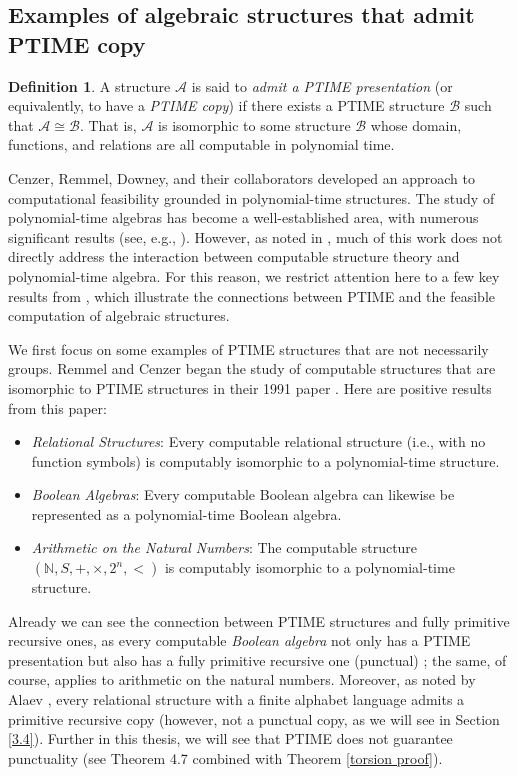 \documentclass{pracalicmgr2025}
\theoremstyle{plain}            %
\theoremstyle{remark}           %
\theoremstyle{definition}       %
\newtheorem{definition}[theorem]{Definition}
\begin{document}
\subsection{Examples of  algebraic structures that admit PTIME copy}
\begin{definition}
A structure $\mathcal{A}$ is said to \emph{admit a PTIME presentation} (or equivalently, to have a \emph{PTIME copy}) if there exists a PTIME structure $\mathcal{B}$ such that $\mathcal{A} \cong \mathcal{B}$. That is, $\mathcal{A}$ is isomorphic to some structure $\mathcal{B}$ whose domain, functions, and relations are all computable in polynomial time.
\end{definition}

Cenzer, Remmel, Downey, and their collaborators developed an approach to computational feasibility grounded in polynomial-time structures. The study of polynomial-time algebras has become a well-established area, with numerous significant results (see, e.g., \cite{CENZER199117,cenzer1992polynomial,cenzer2009space,grigorieff1990every}). However, as noted in \cite{3}, much of this work does not directly address the interaction between computable structure theory and polynomial-time algebra. For this reason, we restrict attention here to a few key results from \cite{cenzer1992polynomial,CENZER199117}, which illustrate the connections between PTIME and the feasible computation of algebraic structures.

We first focus on some examples of PTIME structures that are not necessarily groups. Remmel and Cenzer began the study of computable structures that are isomorphic to PTIME structures in their 1991 paper \cite{CENZER199117}. Here are positive results from this paper:
\begin{itemize}
\item \emph{Relational Structures}: Every computable relational structure (i.e., with no function symbols) is computably isomorphic to a polynomial-time structure.
\item \emph{Boolean Algebras}: Every computable Boolean algebra can likewise be represented as a polynomial-time Boolean algebra.
\item \emph{Arithmetic on the Natural Numbers}: The computable structure $(\mathbb{N}, S, +, \times, 2^n, <)$ is computably isomorphic to a polynomial-time structure.
\end{itemize}

Already we can see the connection between PTIME structures and fully primitive recursive ones, as every computable \emph{Boolean algebra} not only has a PTIME presentation but also has a fully primitive recursive one (punctual) \cite{3}; the same, of course, applies to arithmetic on the natural numbers. Moreover, as noted by Alaev \cite{3}, every relational structure with a finite alphabet language admits a primitive recursive copy (however, not a punctual copy, as we will see in Section \ref{3.4}). Further in this thesis, we will see that PTIME does not guarantee punctuality (see Theorem 4.7 \cite{cenzer1992polynomial} combined with Theorem \ref{torsion proof}). 
\end{document}
